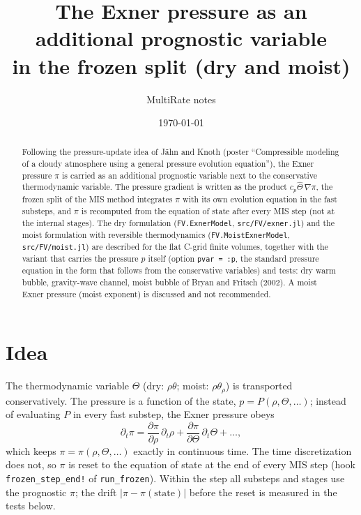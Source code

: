 \documentclass[11pt,a4paper]{article}
\title{The Exner pressure as an additional prognostic variable\\in the frozen split (dry and moist)}
\author{MultiRate notes}
\date{\today}
\newcommand{\code}[1]{\texttt{#1}}
\begin{document}
\sloppy
\maketitle

\begin{abstract}
Following the pressure-update idea of J\"ahn and Knoth (poster ``Compressible modeling of a cloudy
atmosphere using a general pressure evolution equation''), the Exner pressure $\pi$ is carried as an
additional prognostic variable next to the conservative thermodynamic variable. The pressure gradient
is written as the product $c_p\hat\Theta\,\nabla\pi$, the frozen split of the MIS method integrates
$\pi$ with its own evolution equation in the fast substeps, and $\pi$ is recomputed from the equation of
state after every MIS step (not at the internal stages). The dry formulation (\code{FV.ExnerModel},
\code{src/FV/exner.jl}) and the moist formulation with reversible thermodynamics
(\code{FV.MoistExnerModel}, \code{src/FV/moist.jl}) are described for the flat C-grid finite volumes,
together with the variant that carries the pressure $p$ itself (option \code{pvar = :p}, the standard
pressure equation in the form that follows from the conservative variables) and tests: dry warm
bubble, gravity-wave channel, moist bubble of Bryan and Fritsch (2002). A moist Exner pressure (moist
exponent) is discussed and not recommended.
\end{abstract}

\section{Idea}
The thermodynamic variable $\Theta$ (dry: $\rho\theta$; moist: $\rho\theta_\rho$) is transported
conservatively. The pressure is a function of the state, $p=P(\rho,\Theta,\dots)$; instead of evaluating
$P$ in every fast substep, the Exner pressure obeys
\[
\partial_t\pi=\frac{\partial\pi}{\partial\rho}\,\partial_t\rho+\frac{\partial\pi}{\partial\Theta}\,\partial_t\Theta+\dots,
\]
which keeps $\pi=\pi(\rho,\Theta,\dots)$ exactly in continuous time. The time discretization does not,
so $\pi$ is reset to the equation of state at the end of every MIS step (hook
\code{frozen\_step\_end!} of \code{run\_frozen}). Within the step all substeps and stages use the
prognostic $\pi$; the drift $|\pi-\pi(\text{state})|$ before the reset is measured in the tests below.
\end{document}
